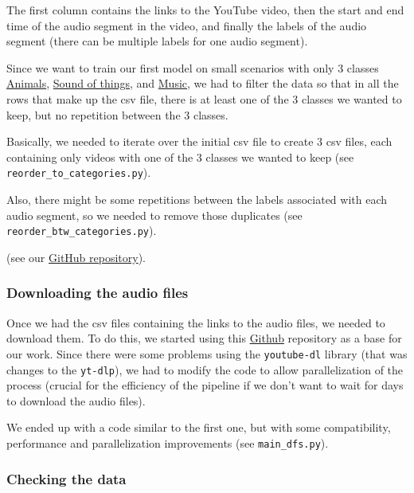 \documentclass[11pt]{article}
\begin{document}
The first column contains the links to the YouTube video, then the start and end time of the audio segment in the video, and finally the labels of the audio segment (there can be multiple labels for one audio segment).

Since we want to train our first model on small scenarios with only 3 classes \href{https://research.google.com/audioset/ontology/animal_1.html}{Animals}, \href{https://research.google.com/audioset/ontology/sounds_of_things_1.html}{Sound of things}, and \href{https://research.google.com/audioset/ontology/music_1.html}{Music}, we had to filter the data so that in all the rows that make up the csv file, there is at least one of the 3 classes we wanted to keep, but no repetition between the 3 classes.

Basically, we needed to iterate over the initial csv file to create 3 csv files, each containing only videos with one of the 3 classes we wanted to keep (see \texttt{reorder\_to\_categories.py}).

Also, there might be some repetitions between the labels associated with each audio segment, so we needed to remove those duplicates (see \texttt{reorder\_btw\_categories.py}).

(see our \href{https://github.com/LGPolytech/Project_S9}{GitHub repository}).

\subsubsection*{Downloading the audio files}

Once we had the csv files containing the links to the audio files, we needed to download them. To do this, we started using this \href{https://github.com/bakhtos/GoogleAudioSetScripts}{Github} repository as a base for our work. Since there were some problems using the \texttt{youtube-dl} library (that was changes to the \texttt{yt-dlp}), we had to modify the code to allow parallelization of the process (crucial for the efficiency of the pipeline if we don't want to wait for days to download the audio files).

We ended up with a code similar to the first one, but with some compatibility, performance and parallelization improvements (see \texttt{main\_dfs.py}).

\subsubsection*{Checking the data}
\end{document}
